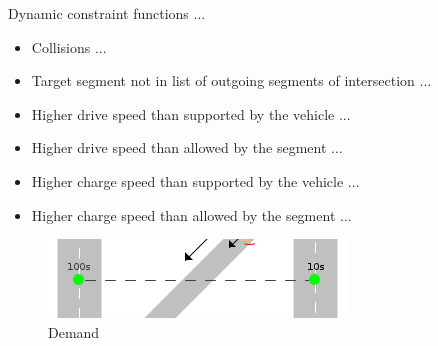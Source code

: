 \documentclass{IEEEtran}
\begin{document}
    Dynamic constraint functions ...
    \begin{itemize}
        \item Collisions ...
        \item Target segment not in list of outgoing segments of intersection ...
        \item Higher drive speed than supported by the vehicle ...
        \item Higher drive speed than allowed by the segment ...
        \item Higher charge speed than supported by the vehicle ...
        \item Higher charge speed than allowed by the segment ...
    \end{itemize}

    \begin{figure}[htbp]
        \centering
        \includegraphics[scale=0.5]{../../concepts/demand.png}
        \caption{Demand}
        \label{fig:demand}
    \end{figure}
\end{document}
